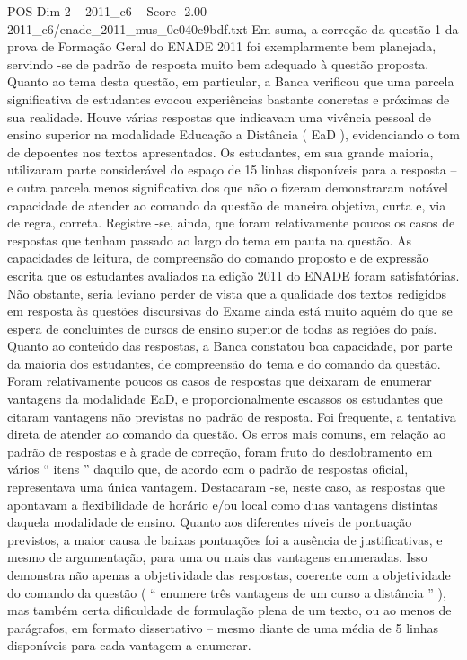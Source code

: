 \begin{textsample}{POS Dim 2 – 2011\_c6 – Score -2.00 – 2011\_c6/enade\_2011\_mus\_0c040c9bdf.txt}
Em suma, a correção da questão 1 da prova de Formação Geral do ENADE 2011 foi exemplarmente bem planejada, servindo -se de padrão de resposta muito bem adequado à questão proposta.
Quanto ao tema desta questão, em particular, a Banca verificou que uma parcela significativa de estudantes evocou experiências bastante concretas e próximas de sua realidade.
Houve várias respostas que indicavam uma vivência pessoal de ensino superior na modalidade Educação a Distância ( EaD ), evidenciando o tom de depoentes nos textos apresentados.
Os estudantes, em sua grande maioria, utilizaram parte considerável do espaço de 15 linhas disponíveis para a resposta – e outra parcela menos significativa dos que não o fizeram demonstraram notável capacidade de atender ao comando da questão de maneira objetiva, curta e, via de regra, correta.
Registre -se, ainda, que foram relativamente poucos os casos de respostas que tenham passado ao largo do tema em pauta na questão.
As capacidades de leitura, de compreensão do comando proposto e de expressão escrita que os estudantes avaliados na edição 2011 do ENADE foram satisfatórias.
Não obstante, seria leviano perder de vista que a qualidade dos textos redigidos em resposta às questões discursivas do Exame ainda está muito aquém do que se espera de concluintes de cursos de ensino superior de todas as regiões do país.
Quanto ao conteúdo das respostas, a Banca constatou boa capacidade, por parte da maioria dos estudantes, de compreensão do tema e do comando da questão.
Foram relativamente poucos os casos de respostas que deixaram de enumerar vantagens da modalidade EaD, e proporcionalmente escassos os estudantes que citaram vantagens não previstas no padrão de resposta.
Foi frequente, a tentativa direta de atender ao comando da questão.
Os erros mais comuns, em relação ao padrão de respostas e à grade de correção, foram fruto do desdobramento em vários “ itens ” daquilo que, de acordo com o padrão de respostas oficial, representava uma única vantagem.
Destacaram -se, neste caso, as respostas que apontavam a flexibilidade de horário e/ou local como duas vantagens distintas daquela modalidade de ensino.
Quanto aos diferentes níveis de pontuação previstos, a maior causa de baixas pontuações foi a ausência de justificativas, e mesmo de argumentação, para uma ou mais das vantagens enumeradas.
Isso demonstra não apenas a objetividade das respostas, coerente com a objetividade do comando da questão ( “ enumere três vantagens de um curso a distância ” ), mas também certa dificuldade de formulação plena de um texto, ou ao menos de parágrafos, em formato dissertativo – mesmo diante de uma média de 5 linhas disponíveis para cada vantagem a enumerar.

\end{textsample}
